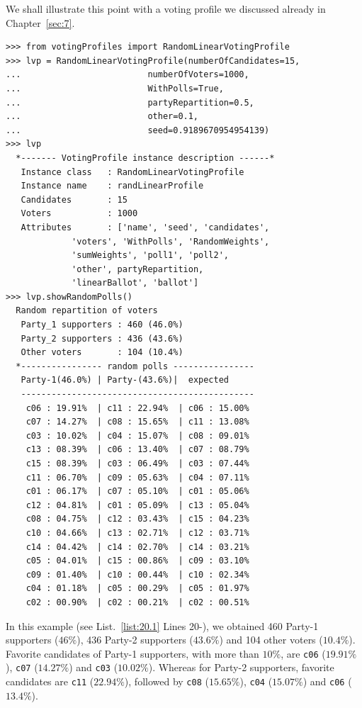 We shall illustrate this point with a voting profile we discussed already in Chapter~\ref{sec:7}.
\begin{lstlisting}[caption={Example of a 3 parties voting profile},label=list:20.1]
>>> from votingProfiles import RandomLinearVotingProfile
>>> lvp = RandomLinearVotingProfile(numberOfCandidates=15,
...                         numberOfVoters=1000,
...                         WithPolls=True,
...                         partyRepartition=0.5,
...                         other=0.1,
...                         seed=0.9189670954954139)
>>> lvp
  *------- VotingProfile instance description ------*
   Instance class   : RandomLinearVotingProfile
   Instance name    : randLinearProfile
   Candidates       : 15
   Voters           : 1000
   Attributes       : ['name', 'seed', 'candidates',
             'voters', 'WithPolls', 'RandomWeights',
             'sumWeights', 'poll1', 'poll2',
             'other', partyRepartition,
             'linearBallot', 'ballot']
>>> lvp.showRandomPolls()
  Random repartition of voters
   Party_1 supporters : 460 (46.0%)
   Party_2 supporters : 436 (43.6%)
   Other voters       : 104 (10.4%)
  *---------------- random polls ----------------
   Party-1(46.0%) | Party-(43.6%)|  expected  
   ----------------------------------------------
    c06 : 19.91%  | c11 : 22.94%  | c06 : 15.00%
    c07 : 14.27%  | c08 : 15.65%  | c11 : 13.08%
    c03 : 10.02%  | c04 : 15.07%  | c08 : 09.01%
    c13 : 08.39%  | c06 : 13.40%  | c07 : 08.79%
    c15 : 08.39%  | c03 : 06.49%  | c03 : 07.44%
    c11 : 06.70%  | c09 : 05.63%  | c04 : 07.11%
    c01 : 06.17%  | c07 : 05.10%  | c01 : 05.06%
    c12 : 04.81%  | c01 : 05.09%  | c13 : 05.04%
    c08 : 04.75%  | c12 : 03.43%  | c15 : 04.23%
    c10 : 04.66%  | c13 : 02.71%  | c12 : 03.71%
    c14 : 04.42%  | c14 : 02.70%  | c14 : 03.21%
    c05 : 04.01%  | c15 : 00.86%  | c09 : 03.10%
    c09 : 01.40%  | c10 : 00.44%  | c10 : 02.34%
    c04 : 01.18%  | c05 : 00.29%  | c05 : 01.97%
    c02 : 00.90%  | c02 : 00.21%  | c02 : 00.51%
\end{lstlisting}

In this example (see List.~\vref{list:20.1} Lines 20-), we obtained 460 Party-1 supporters ($46\%$), 436 Party-2 supporters ($43.6\%$) and 104 other voters ($10.4\%$). Favorite candidates of Party-1 supporters, with more than $10\%$, are \texttt{c06} ($19.91\%$), \texttt{c07} ($14.27\%$) and \texttt{c03} ($10.02\%$). Whereas for Party-2 supporters, favorite candidates are \texttt{c11} ($22.94\%$), followed by \texttt{c08} ($15.65\%$), \texttt{c04} ($15.07\%$) and \texttt{c06} ($13.4\%$).


